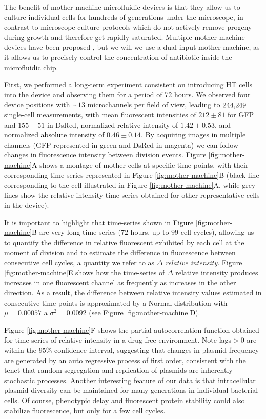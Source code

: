 \documentclass[fleqn,12pt]{wlscirep}
\newcommand{\blue}[1]{\textcolor{black}{#1}}
\newcommand{\fig}[1]{\textcolor{black}{#1}}
\begin{document}
The benefit of mother-machine microfluidic devices is that they allow us to culture individual cells for hundreds of generations under the microscope, in contrast to microscope culture protocols which do not actively remove progeny during growth and therefore get rapidly saturated.  Multiple mother-machine devices have been proposed \cite{taheri2015single,long2013microfluidic}, but we will we use a dual-input mother machine\cite{Kaiser2018}, as it allows us to precisely control the concentration of antibiotic inside the microfluidic chip.  

First, we performed a long-term experiment consistent on introducing HT cells into the device and observing them for a period of 72 hours. 
We observed four device positions with $\sim 13$ microchannels per field of view, leading to $244\blue{,}249$ single-cell measurements, with mean fluorescent intensities of $212\pm 81 $ for GFP and $155\pm 51$ in DsRed, normalized \blue{relative intensity} of $1.42\pm 0.53$, and normalized \blue{absolute intensity} of $0.46\pm 0.14$. 
By acquiring images in multiple channels (GFP represented in green and DsRed in magenta) we can follow changes in fluorescence intensity between division events.  
\fig{Figure \ref{fig:mother-machine}A} shows a montage of mother cells at specific time-points, with their corresponding time-series represented in \fig{Figure \ref{fig:mother-machine}B} (black line corresponding to the cell illustrated in Figure \ref{fig:mother-machine}A, while grey lines show the relative intensity time-series obtained for other representative cells in the device). 

It is important to highlight that time-series shown in \fig{Figure \ref{fig:mother-machine}B} are very long time-series ($72$ hours,  up to $99$ cell cycles), allowing us to quantify the difference in relative fluorescent exhibited by each cell at the moment of division and to estimate the difference in fluorescence between consecutive cell cycles, a quantity we refer to as {\em $\Delta$ relative intensity}.  \fig{Figure \ref{fig:mother-machine}E} shows how the time-series of $\Delta$ relative intensity produces increases in one fluorescent channel as frequently as increases in the other direction.
As a result, the difference between relative intensity values estimated in consecutive time-points is approximated by a Normal distribution with $\mu=0.00057$ a $\sigma^2=0.0092$ (see \fig{Figure \ref{fig:mother-machine}D}).

\fig{Figure \ref{fig:mother-machine}F} shows the partial autocorrelation function obtained for time-series of relative intensity in a drug-free environment. Note lags$>0$ are within the $95\%$ confidence interval, suggesting that changes in plasmid frequency are generated by an auto regressive process of first order, consistent with the tenet that random segregation and replication of plasmids are inherently stochastic processes.
Another interesting feature of our data is that intracellular plasmid diversity can be maintained for many generations in individual bacterial cells. Of course, phenotypic delay\cite{Sun2018} and fluorescent protein stability\cite{Balleza2018} could also stabilize fluorescence, but only for a few cell cycles. 
\end{document}
